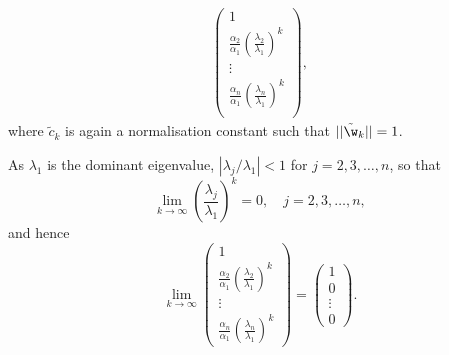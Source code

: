 \begin{exenumerate}
\begin{solution}
\begin{align}
                     \begin{pmatrix}
                       1 \\
                       \frac{\alpha_2}{\alpha_1}\left(\frac{\lambda_2}{\lambda_1}\right)^k \\
                       \vdots \\
                       \frac{\alpha_n}{\alpha_1}\left(\frac{\lambda_n}{\lambda_1}\right)^k \\
                     \end{pmatrix},
    \end{align}
    where $\tilde{c}_k$ is again a normalisation constant such that $||\tilde{\w}_k|| = 1$.
    
    As $\lambda_1$ is the dominant eigenvalue, $|\lambda_j/\lambda_1| < 1$ for $j = 2, 3, \ldots, n$, so that
    \begin{equation}
      \lim_{k \rightarrow \infty} \left(\frac{\lambda_j}{\lambda_1} \right)^k = 0, \quad j=2, 3, \ldots, n,
    \end{equation}
    and hence
    \begin{equation}
      \lim_{k\to \infty}
      \begin{pmatrix}
        1 \\
        \frac{\alpha_2}{\alpha_1}\left(\frac{\lambda_2}{\lambda_1}\right)^k \\
        \vdots \\
        \frac{\alpha_n}{\alpha_1}\left(\frac{\lambda_n}{\lambda_1}\right)^k 
      \end{pmatrix}
      = \begin{pmatrix}
          1 \\
          0\\
          \vdots\\
          0
        \end{pmatrix}.
    \end{equation}


\end{solution}
\end{exenumerate}

